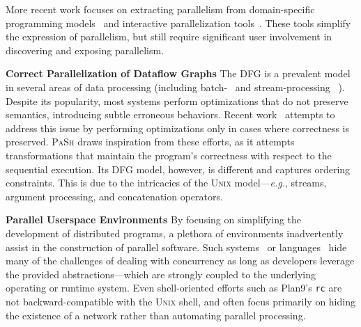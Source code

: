 \documentclass[sigplan, review, screen, anonymous]{acmart}
\newcommand{\eg}{{\em e.g.}, }
\newcommand{\heading}[1]{\vspace{4pt}\noindent\textbf{#1}\enspace}
\newcommand{\ttt}[1]{\texttt{#1}}
\newcommand{\sys}{{\scshape PaSh}\xspace}
\newcommand{\unix}{{\scshape Unix}\xspace}
\begin{document}
More recent work focuses on extracting parallelism from domain-specific programming models~\cite{cilk5, streamIt, galois} and interactive parallelization tools~\cite{parascope, ipat}.
These tools simplify the expression of parallelism, but still require significant user involvement in discovering and exposing parallelism.

\heading{Correct Parallelization of Dataflow Graphs}
The DFG is a prevalent model in several areas of data processing (including batch-~\cite{mapreduce:08, spark:12} and stream-processing ~\cite{murray2013naiad, carbone2015flink}).
Despite its popularity, most systems perform optimizations that do not preserve semantics, introducing subtle erroneous behaviors.
Recent work~\cite{HSSGG2014, SHGW2015, MSAIT2019} attempts to address this issue by performing optimizations only in cases where correctness is preserved.
\sys draws inspiration from these efforts, as it attempts transformations that maintain the program's correctness with respect to the sequential execution.
Its  DFG model, however, is different and captures ordering constraints.
This is due to the intricacies of the \unix model---\eg streams, argument processing, and concatenation operators.

\heading{Parallel Userspace Environments}
By focusing on simplifying the development of distributed programs, a plethora of environments inadvertently assist in the construction of parallel software.
Such systems~\cite{ousterhout1988sprite, mullender1990amoeba, pike1990plan9, barak1998mosix} or languages~\cite{erlang:96, acute:05, mace:07, cloudhaskell:11} hide many of the challenges of dealing with concurrency as long as developers leverage the provided abstractions---which are strongly coupled to the underlying operating or runtime system.
Even shell-oriented efforts such as Plan9's \ttt{rc} are not backward-compatible with the \unix shell, and often focus primarily on hiding the existence of a network rather than automating parallel processing.
\end{document}
